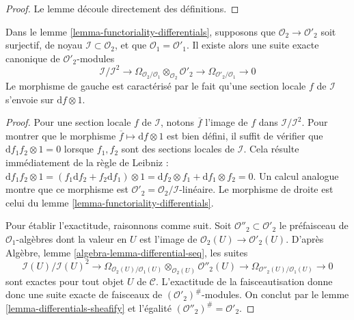 \begin{proof}
Le lemme découle directement des définitions.
\end{proof}

\begin{lemma}

\label{lemma-differential-seq}
Dans le lemme \ref{lemma-functoriality-differentials}, supposons que
$\mathcal{O}_2 \to \mathcal{O}'_2$ soit surjectif, de noyau
$\mathcal{I} \subset \mathcal{O}_2$, et que
$\mathcal{O}_1 = \mathcal{O}'_1$. Il existe alors une suite exacte canonique
de $\mathcal{O}'_2$-modules
$$
\mathcal{I}/\mathcal{I}^2
\longrightarrow
\Omega_{\mathcal{O}_2/\mathcal{O}_1} \otimes_{\mathcal{O}_2} \mathcal{O}'_2
\longrightarrow
\Omega_{\mathcal{O}'_2/\mathcal{O}_1}
\longrightarrow
0
$$
Le morphisme de gauche est caractérisé par le fait qu'une section locale $f$
de $\mathcal{I}$ s'envoie sur $\text{d}f \otimes 1$.
\end{lemma}

\begin{proof}

Pour une section locale $f$ de $\mathcal{I}$, notons $\overline{f}$ l'image de
$f$ dans $\mathcal{I}/\mathcal{I}^2$. Pour montrer que le morphisme
$\overline{f} \mapsto \text{d}f \otimes 1$ est bien défini, il suffit de
vérifier que $\text{d} f_1f_2 \otimes 1 = 0$ lorsque $f_1, f_2$ sont des
sections locales de $\mathcal{I}$. Cela résulte immédiatement de la règle de
Leibniz :
$\text{d} f_1f_2 \otimes 1 =
(f_1 \text{d}f_2 + f_2 \text{d} f_1 )\otimes 1 =
\text{d}f_2 \otimes f_1 + \text{d}f_1 \otimes f_2 = 0$. Un calcul analogue
montre que ce morphisme est $\mathcal{O}'_2 = \mathcal{O}_2/\mathcal{I}$-linéaire.
Le morphisme de droite est celui du lemme
\ref{lemma-functoriality-differentials}.

\medskip\noindent
Pour établir l'exactitude, raisonnons comme suit. Soit
$\mathcal{O}''_2 \subset \mathcal{O}'_2$ le préfaisceau de
$\mathcal{O}_1$-algèbres dont la valeur en $U$ est l'image de
$\mathcal{O}_2(U) \to \mathcal{O}'_2(U)$. D'après Algèbre, lemme
\ref{algebra-lemma-differential-seq}, les suites
$$
\mathcal{I}(U)/\mathcal{I}(U)^2
\longrightarrow
\Omega_{\mathcal{O}_2(U)/\mathcal{O}_1(U)}
\otimes_{\mathcal{O}_2(U)} \mathcal{O}''_2(U)
\longrightarrow
\Omega_{\mathcal{O}''_2(U)/\mathcal{O}_1(U)}
\longrightarrow
0
$$
sont exactes pour tout objet $U$ de $\mathcal{C}$. L'exactitude de la
faisceautisation donne donc une suite exacte de faisceaux de
$(\mathcal{O}'_2)^\#$-modules. On conclut par le lemme
\ref{lemma-differentials-sheafify} et l'égalité
$(\mathcal{O}''_2)^\# = \mathcal{O}'_2$.
\end{proof}

